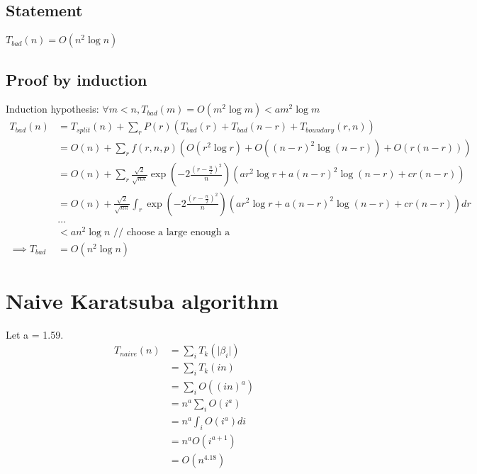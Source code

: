 \documentclass{article}
\begin{document}
\subsection{Statement}
$T_{bad}(n) = O(n^2 \log n)$
\subsection{Proof by induction}
Induction hypothesis: $\forall m < n, T_{bad}(m) = O(m^2 \log m) < am^2 \log m$
\begin{align*}
T_{bad}(n)
&= T_{split}(n) + \sum_r P(r) (T_{bad}(r) + T_{bad}(n-r) + T_{boundary}(r, n))\\
&= O(n) + \sum_r f(r, n, p) (O(r^2 \log r) + O((n-r)^2 \log (n-r)) +
O(r(n-r)))\\
&= O(n) + \sum_r \frac{\sqrt{2}}{\sqrt{n\pi}}
\exp(-2\frac{(r-\frac{n}{2})^2}{n})(ar^2 \log r + a(n-r)^2 \log (n-r) + cr(n-r))\\
&= O(n) + \frac{\sqrt{2}}{\sqrt{n\pi}} \int_r
\exp(-2\frac{(r-\frac{n}{2})^2}{n})(ar^2 \log r + a(n-r)^2 \log (n-r) + cr(n-r)) dr\\
&\ldots\\
&< an^2 \log n \text{ // choose a large enough a} \\
\implies T_{bad} &= O(n^2 \log n)
\end{align*}

\section{Naive Karatsuba algorithm}
Let a = 1.59.
\begin{align*}
T_{naive}(n)
&= \sum_i T_k(\vert \beta_i \vert)\\
&= \sum_i T_k(in)\\
&= \sum_i O((in)^{a})\\
&= n^{a} \sum_i  O(i^{a})\\
&= n^{a} \int_i  O(i^{a}) di\\
&= n^{a} O(i^{a + 1})\\
&= O(n^{4.18})
\end{align*}
\end{document}
